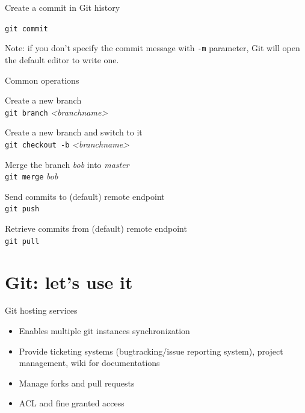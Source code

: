 \begin{frame}[fragile]{Create a commit in Git history}

\vspace{2em}

\Large \texttt{git commit}

\vspace{2em}

Note: if you don't specify the commit message with \texttt{-m} parameter,
Git will open the default editor to write one.

\end{frame}


\begin{frame}[fragile]{Common operations}

Create a new branch \\
\texttt{git branch} \textit{<branchname>}

Create a new branch and switch to it \\
\texttt{git checkout -b} \textit{<branchname>}

Merge the branch \textit{bob} into \textit{master} \\
\texttt{git merge} \textit{bob}

Send commits to (default) remote endpoint \\
\texttt{git push}

Retrieve commits from (default) remote endpoint \\
\texttt{git pull}

\end{frame}




\section{Git: let's use it}

\begin{frame}[fragile]{Git hosting services}
\begin{itemize}
  \item Enables multiple git instances synchronization
  \item Provide ticketing systems (bugtracking/issue reporting system), project
  management, wiki for documentations
  \item Manage forks and pull requests
  \item ACL and fine granted access
\end{itemize}
\end{frame}

